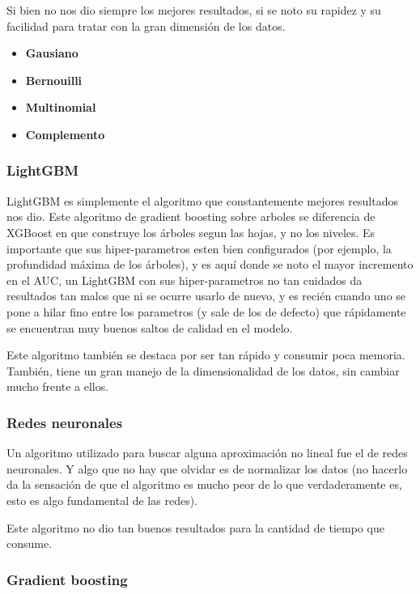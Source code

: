 \documentclass[a4paper]{article}
\begin{document}
Si bien no nos dio siempre los mejores resultados, si se noto su rapidez y su facilidad para tratar con la gran dimensión de los datos.

\begin{itemize}
	\item \textbf{Gausiano}
	\item \textbf{Bernouilli}
	\item \textbf{Multinomial}
 	\item \textbf{Complemento}
\end{itemize}

\subsubsection{LightGBM}

LightGBM es simplemente el algoritmo que constantemente mejores resultados nos dio. Este algoritmo de gradient boosting sobre arboles se diferencia de XGBoost en que construye los árboles segun las hojas, y no los niveles. Es importante que sus hiper-parametros esten bien configurados (por ejemplo, la profundidad máxima de los árboles), y es aquí donde se noto el mayor incremento en el AUC, un LightGBM con sus hiper-parametros no tan cuidados da resultados tan malos que ni se ocurre usarlo de nuevo, y es recién cuando uno se pone a hilar fino entre los parametros (y sale de los de defecto) que rápidamente se encuentran muy buenos saltos de calidad en el modelo.

Este algoritmo también se destaca por ser tan rápido y consumir poca memoria. También, tiene un gran manejo de la dimensionalidad de los datos, sin cambiar mucho frente a ellos.

\subsubsection{Redes neuronales}

Un algoritmo utilizado para buscar alguna aproximación no lineal fue el de redes neuronales. Y algo que no hay que olvidar es de normalizar los datos (no hacerlo da la sensación de que el algoritmo es mucho peor de lo que verdaderamente es, esto es algo fundamental de las redes). 

Este algoritmo no dio tan buenos resultados para la cantidad de tiempo que consume.

\subsubsection{Gradient boosting}
\end{document}
